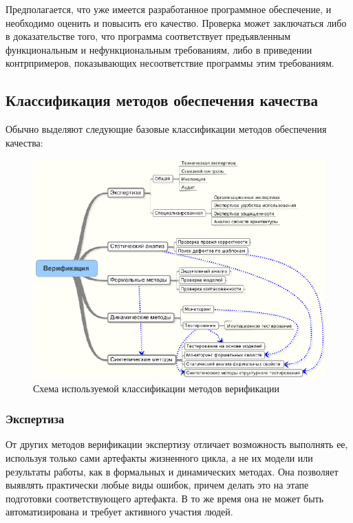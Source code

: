 Предполагается, что уже имеется разработанное программное обеспечение, и
необходимо оценить и повысить его качество. Проверка может заключаться либо в
доказательстве того, что программа соответствует предъявленным функциональным и
нефункциональным требованиям, либо в приведении контрпримеров, показывающих
несоответствие программы этим требованиям.

\newpage
\subsection{Классификация методов обеспечения качества} %

Обычно выделяют следующие базовые классификации методов обеспечения качества:

\begin{figure}[h!]
    \begin{center}
        \includegraphics[width=\textwidth]{img/verification_classification.png}
    \end{center}
    \caption{Схема используемой классификации методов верификации}
    \label{fig:figure3}
\end{figure}

\subsubsection{Экспертиза} %

От других методов верификации экспертизу отличает возможность выполнять ее,
используя только сами артефакты жизненного цикла, а не их модели или результаты
работы, как в формальных и динамических методах. Она позволяет выявлять
практически любые виды ошибок, причем делать это на этапе подготовки
соответствующего артефакта. В то же время она не может быть автоматизирована и
требует активного участия людей.

